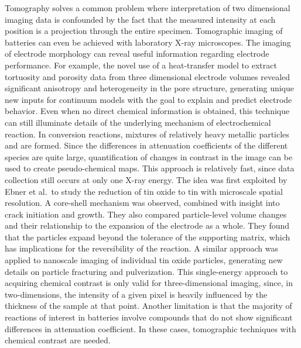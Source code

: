 \documentclass[journal=cmatex,manuscript=perspective]{achemso}
\begin{document}
Tomography solves a common problem where interpretation of two
dimensional imaging data is confounded by the fact that the measured
intensity at each position is a projection through the entire
specimen. Tomographic imaging of batteries can even be achieved with
laboratory X-ray microscopes\cite{shearing2014-2}. The imaging of
electrode morphology can reveal useful information regarding electrode
performance. For example, the novel use of a heat-transfer model to
extract tortuosity and porosity data from three dimensional electrode
volumes revealed significant anisotropy and heterogeneity in the pore
structure, generating unique new inputs for continuum models with the
goal to explain and predict electrode
behavior\cite{shearing2014}. Even when no direct chemical information
is obtained, this technique can still illuminate details of the
underlying mechanism of electrochemical reaction. In conversion
reactions, mixtures of relatively heavy metallic particles and
 are formed\cite{cabana2010-2}. Since the differences in
attenuation coefficients of the different species are quite large,
quantification of changes in contrast in the image can be used to
create pseudo-chemical maps. This approach is relatively fast, since
data collection still occurs at only one X-ray energy. The idea was
first exploited by Ebner et al.\ to study the reduction of tin oxide
to tin with microscale spatial resolution. A core-shell mechanism was
observed, combined with insight into crack initiation and growth. They
also compared particle-level volume changes and their relationship to
the expansion of the electrode as a whole. They found that the
particles expand beyond the tolerance of the supporting matrix, which
has implications for the reversibility of the
reaction\cite{ebner2013}. A similar approach was applied to nanoscale
imaging of individual tin oxide particles, generating new details on
particle fracturing and pulverization\cite{wang2014-2}. This
single-energy approach to acquiring chemical contrast is only valid
for three-dimensional imaging, since, in two-dimensions, the intensity
of a given pixel is heavily influenced by the thickness of the sample
at that point. Another limitation is that the majority of reactions of
interest in batteries involve compounds that do not show significant
differences in attenuation coefficient. In these cases, tomographic
techniques with chemical contrast are needed.
\end{document}
